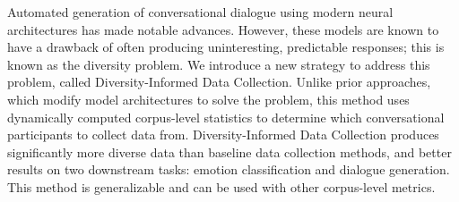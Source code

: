 Automated generation of conversational dialogue using modern neural architectures has made notable advances.  However, these models are known to have a drawback of often producing uninteresting, predictable responses; this is known as the diversity problem. We introduce a new strategy to address this problem, called Diversity-Informed Data Collection. Unlike prior approaches, which modify model architectures to solve the problem, this method uses dynamically computed corpus-level statistics to determine which conversational participants to collect data from. Diversity-Informed Data Collection produces significantly more diverse data than baseline data collection methods, and better results on two downstream tasks: emotion classification and dialogue generation.  This method is generalizable and can be used with other corpus-level metrics.
